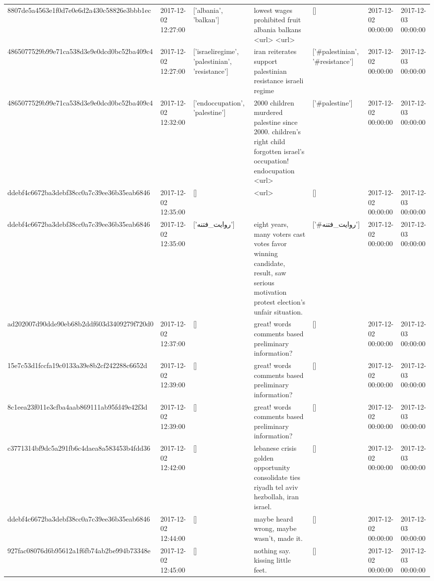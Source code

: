 \begin{tabular}{lllllll}
8807de5a4563e1f0d7e0e6d2a430c58826e3bbb1ec & 2017-12-02 12:27:00 & ['albania', 'balkan'] & lowest wages prohibited fruit albania balkans <url> <url> & [] & 2017-12-02 00:00:00 & 2017-12-03 00:00:00 \\
4865077529b99e71ca538d3e9e0dcd0bc52ba409c4 & 2017-12-02 12:27:00 & ['israeliregime', 'palestinian', 'resistance'] & iran reiterates support palestinian resistance israeli regime & ['#palestinian', '#resistance'] & 2017-12-02 00:00:00 & 2017-12-03 00:00:00 \\
4865077529b99e71ca538d3e9e0dcd0bc52ba409c4 & 2017-12-02 12:32:00 & ['endoccupation', 'palestine'] & 2000 children murdered palestine since 2000. children's right child forgotten israel's occupation! endocupation <url> & ['#palestine'] & 2017-12-02 00:00:00 & 2017-12-03 00:00:00 \\
ddebf4c6672ba3debf38cc0a7c39ee36b35eab6846 & 2017-12-02 12:35:00 & [] & <url> & [] & 2017-12-02 00:00:00 & 2017-12-03 00:00:00 \\
ddebf4c6672ba3debf38cc0a7c39ee36b35eab6846 & 2017-12-02 12:35:00 & ['روایت_فتنه'] & eight years, many voters cast votes favor winning candidate, result, saw serious motivation protest election's unfair situation. & ['#روایت_فتنه'] & 2017-12-02 00:00:00 & 2017-12-03 00:00:00 \\
ad202007d90dde90eb68b2ddf603d3409279f720d0 & 2017-12-02 12:37:00 & [] & great! words comments based preliminary information? & [] & 2017-12-02 00:00:00 & 2017-12-03 00:00:00 \\
15e7c53d1fccfa19c0133a39e8b2cf242288c6652d & 2017-12-02 12:39:00 & [] & great! words comments based preliminary information? & [] & 2017-12-02 00:00:00 & 2017-12-03 00:00:00 \\
8c1eea23f011e3cfba4aab869111ab95fd49e42f3d & 2017-12-02 12:39:00 & [] & great! words comments based preliminary information? & [] & 2017-12-02 00:00:00 & 2017-12-03 00:00:00 \\
c3771314bf9dc5a291fb6c4daea8a583453b4fdd36 & 2017-12-02 12:42:00 & [] & lebanese crisis golden opportunity consolidate ties riyadh tel aviv hezbollah, iran israel. & [] & 2017-12-02 00:00:00 & 2017-12-03 00:00:00 \\
ddebf4c6672ba3debf38cc0a7c39ee36b35eab6846 & 2017-12-02 12:44:00 & [] & maybe heard wrong, maybe wasn't, made it. & [] & 2017-12-02 00:00:00 & 2017-12-03 00:00:00 \\
927fac08076d6b95612a1f6fb74ab2be994b73348e & 2017-12-02 12:45:00 & [] & nothing say. kissing little feet. & [] & 2017-12-02 00:00:00 & 2017-12-03 00:00:00 \\

\end{tabular}
